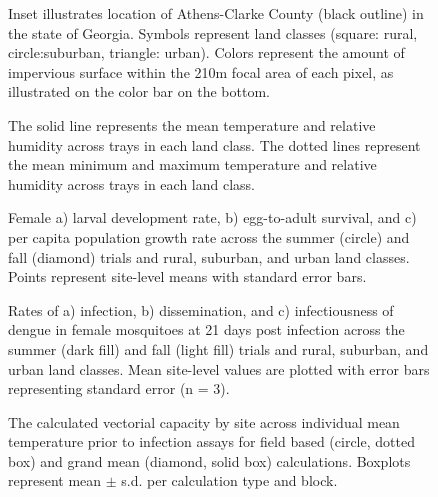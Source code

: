 \documentclass[doublespacing, linenumbers]{bmcart}
\begin{document}
\begin{backmatter}
\begin{figure}[h!]
  \caption{
      Inset illustrates location of Athens-Clarke County (black outline) in the state of Georgia. Symbols represent land classes (square: rural, circle:suburban, triangle: urban). Colors represent the amount of impervious surface within the 210m focal area of each pixel, as illustrated on the color bar on the bottom.}
   \label{Fig:map}
\end{figure}

\begin{figure}[h!]
  \caption{
      The solid line represents the mean temperature and relative humidity across trays in each land class. The dotted lines represent the mean minimum and maximum temperature and relative humidity across trays in each land class.}
        \label{Fig:climate}
\end{figure}

\begin{figure}[h!]
  \caption{
      Female a) larval development rate, b) egg-to-adult survival, and c) per capita population growth rate across the summer (circle) and fall (diamond) trials and rural, suburban, and urban land classes. Points represent site-level means with standard error bars.}
    \label{Fig:demographic}
\end{figure}

\begin{figure}[h!]
  \caption{
      Rates of a) infection, b) dissemination, and c) infectiousness of dengue in female mosquitoes at 21 days post infection across the summer (dark fill) and fall (light fill) trials and rural, suburban, and urban land classes. Mean site-level values are plotted with error bars representing standard error (n = 3).}
        \label{Fig:infection}
\end{figure}

\begin{figure}[h!]
  \caption{
      The calculated vectorial capacity by site across individual mean temperature prior to infection assays for field based (circle, dotted box) and grand mean (diamond, solid box) calculations. Boxplots represent mean $\pm$ s.d. per calculation type and block.}
   \label{Fig:VC}
\end{figure}



\end{backmatter}
\end{document}

